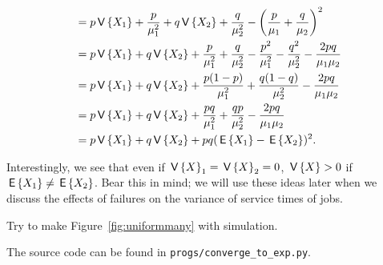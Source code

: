 \begin{question}
\begin{solution}
\begin{equation*}
\begin{split}
&= p \,\mathsf{V}\left\{X_1\right\} + \frac{p}{\mu_1^2} + q \,\mathsf{V}\left\{X_2\right\} + \frac{q}{\mu_2^2} - \left(\frac{p}{\mu_1}+\frac{q}{\mu_2}\right)^2 \\ 
&= p \,\mathsf{V}\left\{X_1\right\} + q \,\mathsf{V}\left\{X_2\right\}
+ \frac{p}{\mu_1^2} + \frac{q}{\mu_2^2}
- \frac{p^2}{\mu_1^2}-\frac{q^2}{\mu_2^2}  -\frac{2pq}{\mu_1\mu_2}\\ 
&= p \,\mathsf{V}\left\{X_1\right\} + q \,\mathsf{V}\left\{X_2\right\}
+ \frac{p(1-p)}{\mu_1^2} + \frac{q(1-q)}{\mu_2^2}
-\frac{2pq}{\mu_1\mu_2}\\ 
&= p \,\mathsf{V}\left\{X_1\right\} + q \,\mathsf{V}\left\{X_2\right\}
+ \frac{pq}{\mu_1^2} + \frac{qp}{\mu_2^2}
-\frac{2pq}{\mu_1\mu_2}\\ 
&= p \,\mathsf{V}\left\{X_1\right\} + q \,\mathsf{V}\left\{X_2\right\}
+ pq(\,\mathsf{E}\left\{X_1\right\} - \,\mathsf{E}\left\{X_2\right\})^2.
\end{split}
\end{equation*}

Interestingly, we see that even if $\,\mathsf{V}\left\{X\right\}_1 = \,\mathsf{V}\left\{X\right\}_2 = 0$, $\,\mathsf{V}\left\{X\right\} > 0$
if $\,\mathsf{E}\left\{X_1\right\} \neq \,\mathsf{E}\left\{X_2\right\}$. Bear this in mind; we will use these ideas
later when we discuss the effects of failures on the variance of
service times of jobs.

\end{solution}
\end{question}

\begin{question}
  Try to make Figure~\ref{fig:uniformmany} with simulation.
  \begin{solution}
    The source code can be found in \texttt{progs/converge\_to\_exp.py}.
\end{solution}
\end{question}
  


